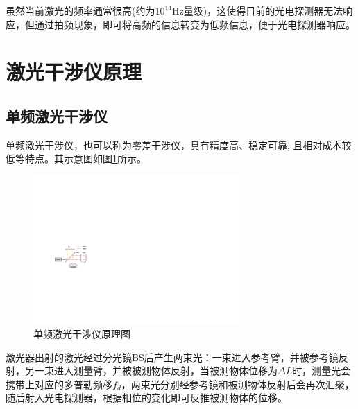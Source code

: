 虽然当前激光的频率通常很高(约为\(10^{14}\)Hz量级)，这使得目前的光电探测器无法响应\cite{张志平2022激光外差干涉技术在光刻机中的应用}，但通过拍频现象，即可将高频的信息转变为低频信息，便于光电探测器响应。

\section{激光干涉仪原理}
\subsection{单频激光干涉仪}
单频激光干涉仪，也可以称为零差干涉仪，具有精度高、稳定可靠, 且相对成本较低等特点\cite{零差干涉仪用于振动校准中关键技术的研究}。其示意图如图\ref{fig:单频激光干涉仪原理图}所示。
\begin{figure}[htb]
    \centering
    \includegraphics[width=8cm]{fig/2-fig/单频激光干涉仪原理图.drawio.pdf}
    \caption{单频激光干涉仪原理图}
    \label{fig:单频激光干涉仪原理图}
\end{figure}

激光器出射的激光经过分光镜BS后产生两束光：一束进入参考臂，并被参考镜反射，另一束进入测量臂，并被被测物体反射，当被测物体位移为\(\Delta L\)时，测量光会携带上对应的多普勒频移\(f_d\)，两束光分别经参考镜和被测物体反射后会再次汇聚，随后射入光电探测器，根据相位的变化即可反推被测物体的位移。

